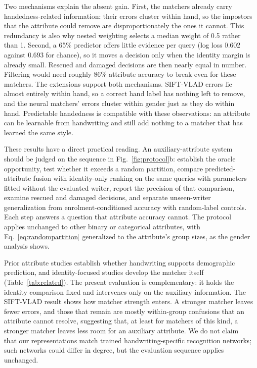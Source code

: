 \documentclass[ASNA,twocolumn]{USG}
\begin{document}
Two mechanisms explain the absent gain. First, the matchers already carry handedness-related information: their errors cluster within hand, so the impostors that the attribute could remove are disproportionately the ones it cannot. This redundancy is also why nested weighting selects a median weight of 0.5 rather than 1. Second, a 65\% predictor offers little evidence per query (log loss 0.602 against 0.693 for chance), so it moves a decision only when the identity margin is already small. Rescued and damaged decisions are then nearly equal in number. Filtering would need roughly 86\% attribute accuracy to break even for these matchers. The extensions support both mechanisms. SIFT-VLAD errors lie almost entirely within hand, so a correct hand label has nothing left to remove, and the neural matchers' errors cluster within gender just as they do within hand. Predictable handedness \cite{prappo2026handedness} is compatible with these observations: an attribute can be learnable from handwriting and still add nothing to a matcher that has learned the same style.

These results have a direct practical reading. An auxiliary-attribute system should be judged on the sequence in Fig.~\ref{fig:protocol}b: establish the oracle opportunity, test whether it exceeds a random partition, compare predicted-attribute fusion with identity-only ranking on the same queries with parameters fitted without the evaluated writer, report the precision of that comparison, examine rescued and damaged decisions, and separate unseen-writer generalization from enrolment-conditioned accuracy with random-label controls. Each step answers a question that attribute accuracy cannot. The protocol applies unchanged to other binary or categorical attributes, with Eq.~\eqref{eq:randompartition} generalized to the attribute's group sizes, as the gender analysis shows.

Prior attribute studies establish whether handwriting supports demographic prediction, and identity-focused studies develop the matcher itself (Table~\ref{tab:related}). The present evaluation is complementary: it holds the identity comparison fixed and intervenes only on the auxiliary information. The SIFT-VLAD result shows how matcher strength enters. A stronger matcher leaves fewer errors, and those that remain are mostly within-group confusions that an attribute cannot resolve, suggesting that, at least for matchers of this kind, a stronger matcher leaves less room for an auxiliary attribute. We do not claim that our representations match trained handwriting-specific recognition networks; such networks could differ in degree, but the evaluation sequence applies unchanged.
\end{document}
